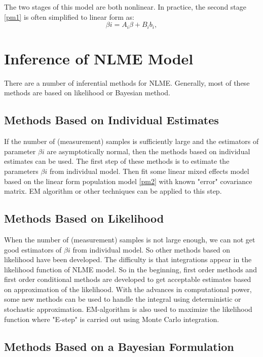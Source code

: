 \documentclass[12pt]{extarticle}
\begin{document}
The two stages of this model are both nonlinear. In practice, the second stage \eqref{pm1} is often simplified to linear form as:
\begin{equation}
\beta{i}=A_{i}\beta+B_{i}b_{i}, \label{pm2} 
\end{equation}

\section{Inference of NLME Model}
\label{sect:infer}
There are a number of inferential methods for NLME.  Generally, most of these methods are based on likelihood or Bayesian method.

\subsection{Methods Based on Individual Estimates} 
\label{sect:ie}
If the number of (measurement) samples is sufficiently large and the estimators of parameter $\beta{i}$ are asymptotically normal, then the methods based on individual estimates can be used. The first step of these methods is to estimate the parameters $\beta{i}$ from individual model. Then fit some linear mixed effects model based on the linear form population model \eqref{pm2} with known "error" covariance matrix. EM algorithm or other techniques can be applied to this step.

\subsection{Methods Based on  Likelihood}
\label{likelihood}
When the number of (measurement) samples is not large enough, we can not get good estimators of  $\beta{i}$ from individual model. So other methods based on likelihood have been developed. The difficulty is that integrations appear in the likelihood function of NLME model. So in the beginning, first order methods and first order conditional methods are developed to get acceptable estimates based on approximation of the likelihood. With the advances in computational power, some new methods can be used to handle the integral using deterministic or stochastic approximation. EM-algorithm is also used to maximize the likelihood function where "E-step" is carried out using Monte Carlo integration.

\subsection{Methods Based on a Bayesian Formulation}
\label{bayesian}
\end{document}
